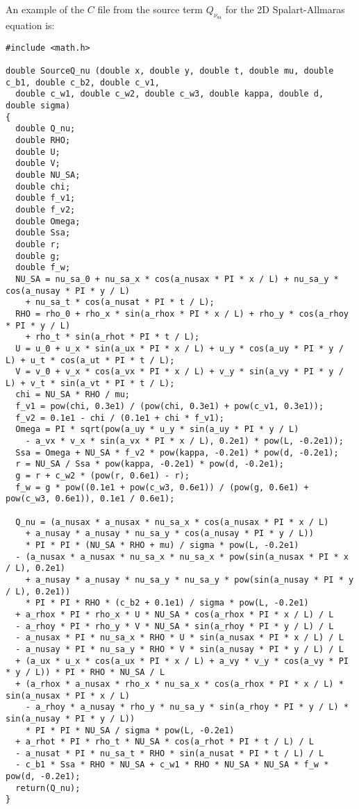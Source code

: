 \documentclass[10pt]{article}
\newcommand{\sa}{\nu_{\mathrm{sa}}}
\begin{document}
An example of the $C$ file from the source term $Q_{\sa}$ for the 2D Spalart-Allmaras equation is:
\begin{footnotesize}
\begin{verbatim}#include <math.h>

double SourceQ_nu (double x, double y, double t, double mu, double c_b1, double c_b2, double c_v1,
  double c_w1, double c_w2, double c_w3, double kappa, double d, double sigma)
{
  double Q_nu;
  double RHO;
  double U;
  double V;
  double NU_SA;
  double chi;
  double f_v1;
  double f_v2;
  double Omega;
  double Ssa;
  double r;
  double g;
  double f_w;
  NU_SA = nu_sa_0 + nu_sa_x * cos(a_nusax * PI * x / L) + nu_sa_y * cos(a_nusay * PI * y / L)
    + nu_sa_t * cos(a_nusat * PI * t / L);
  RHO = rho_0 + rho_x * sin(a_rhox * PI * x / L) + rho_y * cos(a_rhoy * PI * y / L)
    + rho_t * sin(a_rhot * PI * t / L);
  U = u_0 + u_x * sin(a_ux * PI * x / L) + u_y * cos(a_uy * PI * y / L) + u_t * cos(a_ut * PI * t / L);
  V = v_0 + v_x * cos(a_vx * PI * x / L) + v_y * sin(a_vy * PI * y / L) + v_t * sin(a_vt * PI * t / L);
  chi = NU_SA * RHO / mu;
  f_v1 = pow(chi, 0.3e1) / (pow(chi, 0.3e1) + pow(c_v1, 0.3e1));
  f_v2 = 0.1e1 - chi / (0.1e1 + chi * f_v1);
  Omega = PI * sqrt(pow(a_uy * u_y * sin(a_uy * PI * y / L)
    - a_vx * v_x * sin(a_vx * PI * x / L), 0.2e1) * pow(L, -0.2e1));
  Ssa = Omega + NU_SA * f_v2 * pow(kappa, -0.2e1) * pow(d, -0.2e1);
  r = NU_SA / Ssa * pow(kappa, -0.2e1) * pow(d, -0.2e1);
  g = r + c_w2 * (pow(r, 0.6e1) - r);
  f_w = g * pow((0.1e1 + pow(c_w3, 0.6e1)) / (pow(g, 0.6e1) + pow(c_w3, 0.6e1)), 0.1e1 / 0.6e1);

  Q_nu = (a_nusax * a_nusax * nu_sa_x * cos(a_nusax * PI * x / L)
    + a_nusay * a_nusay * nu_sa_y * cos(a_nusay * PI * y / L))
    * PI * PI * (NU_SA * RHO + mu) / sigma * pow(L, -0.2e1)
  - (a_nusax * a_nusax * nu_sa_x * nu_sa_x * pow(sin(a_nusax * PI * x / L), 0.2e1)
    + a_nusay * a_nusay * nu_sa_y * nu_sa_y * pow(sin(a_nusay * PI * y / L), 0.2e1))
    * PI * PI * RHO * (c_b2 + 0.1e1) / sigma * pow(L, -0.2e1)
  + a_rhox * PI * rho_x * U * NU_SA * cos(a_rhox * PI * x / L) / L
  - a_rhoy * PI * rho_y * V * NU_SA * sin(a_rhoy * PI * y / L) / L
  - a_nusax * PI * nu_sa_x * RHO * U * sin(a_nusax * PI * x / L) / L
  - a_nusay * PI * nu_sa_y * RHO * V * sin(a_nusay * PI * y / L) / L
  + (a_ux * u_x * cos(a_ux * PI * x / L) + a_vy * v_y * cos(a_vy * PI * y / L)) * PI * RHO * NU_SA / L
  + (a_rhox * a_nusax * rho_x * nu_sa_x * cos(a_rhox * PI * x / L) * sin(a_nusax * PI * x / L)
    - a_rhoy * a_nusay * rho_y * nu_sa_y * sin(a_rhoy * PI * y / L) * sin(a_nusay * PI * y / L))
    * PI * PI * NU_SA / sigma * pow(L, -0.2e1)
  + a_rhot * PI * rho_t * NU_SA * cos(a_rhot * PI * t / L) / L
  - a_nusat * PI * nu_sa_t * RHO * sin(a_nusat * PI * t / L) / L
  - c_b1 * Ssa * RHO * NU_SA + c_w1 * RHO * NU_SA * NU_SA * f_w * pow(d, -0.2e1);
  return(Q_nu);
}
\end{verbatim}
\end{footnotesize}


 

\end{document}
